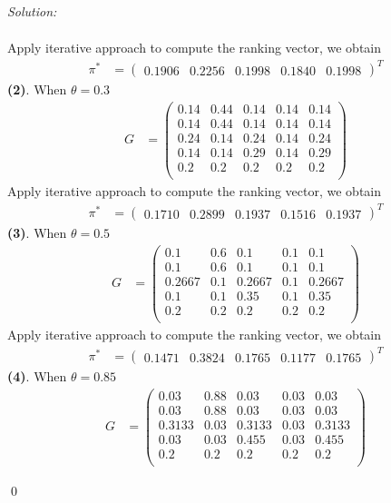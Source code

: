 \documentclass[12pt]{article}
\newenvironment{sol}
    {\emph{Solution:}
    }
    {
    \qed
    }
\begin{document}
\begin{sol}
\begin{align*}
	\end{align*}
	Apply iterative approach to compute the ranking vector, we obtain
	\begin{align*}
		\pi^* &= \begin{pmatrix}0.1906 & 0.2256 & 0.1998 & 0.1840 & 0.1998\end{pmatrix}^T
	\end{align*}
	\textbf{(2)}. When $\theta = 0.3$
	\begin{align*}
		G &= \begin{pmatrix}0.14 & 0.44 & 0.14 & 0.14 & 0.14 \\ 0.14 & 0.44 & 0.14 & 0.14 & 0.14 \\ 0.24 & 0.14 & 0.24 & 0.14 & 0.24 \\ 0.14 & 0.14 & 0.29 & 0.14 & 0.29 \\ 0.2 & 0.2 & 0.2 & 0.2 & 0.2 \\\end{pmatrix}
	\end{align*}
	Apply iterative approach to compute the ranking vector, we obtain
	\begin{align*}
	\pi^* &= \begin{pmatrix}0.1710 & 0.2899 & 0.1937 & 0.1516 & 0.1937\end{pmatrix}^T
	\end{align*}
	\textbf{(3)}. When $\theta = 0.5$
	\begin{align*}
	G &= \begin{pmatrix}0.1 & 0.6 & 0.1 & 0.1 & 0.1 \\ 0.1 & 0.6 & 0.1 & 0.1 & 0.1 \\ 0.2667 & 0.1 & 0.2667 & 0.1 & 0.2667 \\ 0.1 & 0.1 & 0.35 & 0.1 & 0.35 \\ 0.2 & 0.2 & 0.2 & 0.2 & 0.2 \\\end{pmatrix}
	\end{align*}
	Apply iterative approach to compute the ranking vector, we obtain
	\begin{align*}
	\pi^* &= \begin{pmatrix}0.1471 & 0.3824 & 0.1765 & 0.1177 & 0.1765\end{pmatrix}^T
	\end{align*}
	\textbf{(4)}. When $\theta = 0.85$
	\begin{align*}
	G &= \begin{pmatrix}0.03 & 0.88 & 0.03 & 0.03 & 0.03 \\ 0.03 & 0.88 & 0.03 & 0.03 & 0.03 \\ 0.3133 & 0.03 & 0.3133 & 0.03 & 0.3133 \\ 0.03 & 0.03 & 0.455 & 0.03 & 0.455 \\ 0.2 & 0.2 & 0.2 & 0.2 & 0.2 \\\end{pmatrix}

\end{align*}
\end{sol}
\end{document}
